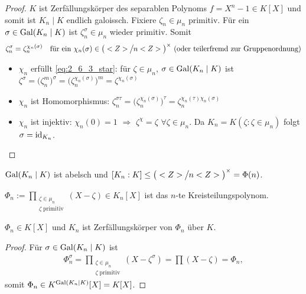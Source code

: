 \begin{proof}
	$K$ ist Zerfällungskörper des separablen Polynoms $f=X^n - 1\in K[X]$ und somit ist $K_n\mid K$ endlich galoissch. Fixiere $\zeta_n\in \mu_n$ primitiv. Für ein $\sigma\in \Gal(K_n\mid K)$ ist $\zeta_n^\sigma\in\mu_n$ wieder primitiv. Somit \begin{align*}
		\zeta_n^\sigma = \zeta_n^{\chi_n(\sigma)} \quad\text{für ein $\chi_n(\sigma)\in \big(\mathbb Z\mskip-1mu\big\slash\mskip-1mu n\mathbb Z\big)^\times$ (oder teilerfremd zur Gruppenordnung)}
	\end{align*}
	\begin{itemize}[left=0pt]
		\item $\chi_n$ erfüllt \cref{eq:2_6_3_star}: für $\zeta\in\mu_n$, $\sigma\in\Gal(K_n\mid K)$ ist $\zeta^\sigma = \Big(\zeta_n^m\Big)^\sigma = \Big(\zeta_n^{\chi_n(\sigma)}\Big) ^m = \zeta^{\chi_n(\sigma)}$
		\item $\chi_n $ ist Homomorphismus: $\zeta_n^{\sigma\tau} = \big(\zeta_n^{\chi_n(\sigma)}\big)^\tau = \zeta_n^{\chi_n(\tau)\chi_n(\sigma)}$
		\item $\chi_n$ ist injektiv: $\chi_n(0) = 1$ $\Rightarrow$ $\zeta^\chi = \zeta$ $\forall \zeta\in \mu_n$. Da $K_n = K(\zeta: \zeta\in\mu_n)$ folgt $\sigma = \id_{K_n}$.
	\end{itemize}
\end{proof}

\begin{conclusion}
	$\Gal(K_n\mid K)$ ist abelsch und $[K_n:K]\le \big(\mathbb Z\mskip-1mu\big\slash\mskip-1mu n\mathbb Z\big)^\times = \Phi(n)$.
\end{conclusion}

\begin{definition}
	$\displaystyle \Phi_n := \prod_{\substack{\zeta\in\mu_n \\ \zeta\;\text{primitiv}}} (X-\zeta)\in K_n[X]$ ist das $n$-te Kreisteilungspolynom.
\end{definition}

\begin{lemma}
	$\Phi_n\in K[X]$ und $K_n$ ist Zerfällungskörper von $\Phi_n$ über $K$.
\end{lemma}

\begin{proof}
	Für $\sigma\in\Gal(K_n\mid K)$ ist \begin{align*}
		\Phi_n^\sigma = \prod_{\substack{\zeta\in\mu_n \\ \zeta\;\text{primitiv}}} (X-\zeta^\sigma) = \prod(X-\zeta) = \Phi_n,
	\end{align*}
	somit $\Phi_n\in K^{\Gal(K_n\mid K)}[X] = K[X]$.
\end{proof}

